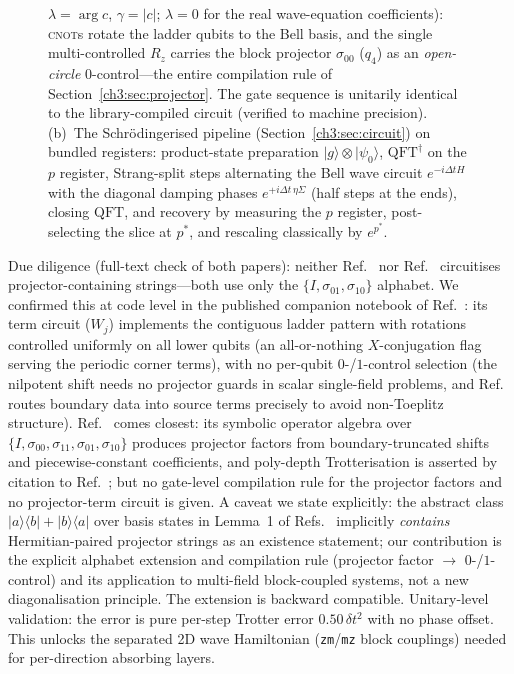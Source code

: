 \begin{figure}[tb]
{  $\lambda=\arg c$, $\gamma=|c|$; $\lambda=0$ for the real wave-equation
  coefficients): \textsc{cnot}s rotate the ladder qubits to the Bell
  basis, and the single multi-controlled $R_z$ carries the block
  projector $\sigma_{00}$ ($q_4$) as an \emph{open-circle}
  $0$-control---the entire compilation rule of
  Section~\protect\ref{ch3:sec:projector}.  The gate sequence is unitarily identical to
  the library-compiled circuit (verified to machine precision).
  (b)~The Schr\"odingerised pipeline (Section~\protect\ref{ch3:sec:circuit}) on bundled
  registers: product-state preparation
  $\lvert g\rangle\otimes\lvert\psi_0\rangle$, $\mathrm{QFT}^{\dagger}$
  on the $p$ register, Strang-split steps alternating the Bell wave
  circuit $e^{-i\Delta t H}$ with the diagonal damping phases
  $e^{+i\Delta t\,\eta\Sigma}$ (half steps at the ends), closing
  $\mathrm{QFT}$, and recovery by measuring the $p$ register,
  post-selecting the slice at $p^{*}$, and rescaling classically by
  $e^{p^{*}}$.}
  \label{ch3:fig:circuits}
\end{figure}

Due diligence (full-text check of both papers): neither
Ref.~\cite{hu2024quantum} nor Ref.~\cite{jin2024heat} circuitises
projector-containing strings---both use only the
$\{I,\sigma_{01},\sigma_{10}\}$ alphabet.  We confirmed this at code
level in the published companion notebook of
Ref.~\cite{hu2024quantum}: its term circuit ($W_j$) implements the
contiguous ladder pattern with rotations controlled uniformly on all
lower qubits (an all-or-nothing $X$-conjugation flag serving the
periodic corner terms), with no per-qubit $0$-/$1$-control selection
(the nilpotent shift needs no
projector guards in scalar single-field problems, and
Ref.~\cite{jin2024heat} routes boundary data into source terms precisely
to avoid non-Toeplitz structure).  Ref.~\cite{sato2025nonconservative}
comes closest: its symbolic operator algebra over
$\{I,\sigma_{00},\sigma_{11},\sigma_{01},\sigma_{10}\}$ produces
projector factors from boundary-truncated shifts and piecewise-constant
coefficients, and poly-depth Trotterisation is asserted by citation to
Ref.~\cite{sato2024hamiltonian}; but no gate-level compilation rule for
the projector factors and no projector-term circuit is given.  A caveat
we state explicitly: the
abstract class $\lvert a\rangle\langle b\rvert + \lvert b\rangle\langle
a\rvert$ over basis states in Lemma~1 of
Refs.~\cite{sato2024hamiltonian,hu2024quantum} implicitly \emph{contains}
Hermitian-paired projector strings as an existence statement; our
contribution is the explicit alphabet extension and compilation rule
(projector factor $\to$ $0$-/$1$-control) and its application to
multi-field block-coupled systems, not a new diagonalisation principle.
The extension is backward compatible.  Unitary-level validation: the
error is pure per-step Trotter error $0.50\,\delta t^{2}$ with no phase
offset.  This unlocks the separated 2D wave Hamiltonian
(\texttt{zm}/\texttt{mz} block couplings) needed for per-direction
absorbing layers.

